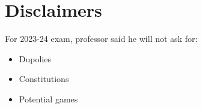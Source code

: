 \documentclass{article}
\begin{document}
\tableofcontents

\newpage
{} 


\newpage

\newpage

\newpage

\newpage

\newpage

\newpage

\newpage

\newpage

\newpage


\newpage

\newpage

\newpage

\newpage

\newpage

\newpage

\newpage

\newpage

\newpage

\newpage


\newpage




\newpage
\section{Disclaimers}
For 2023-24 exam, professor said he will not ask for:
\begin{itemize}
    \item Dupolies
    \item Constitutions
    \item Potential games
\end{itemize}
\end{document}
